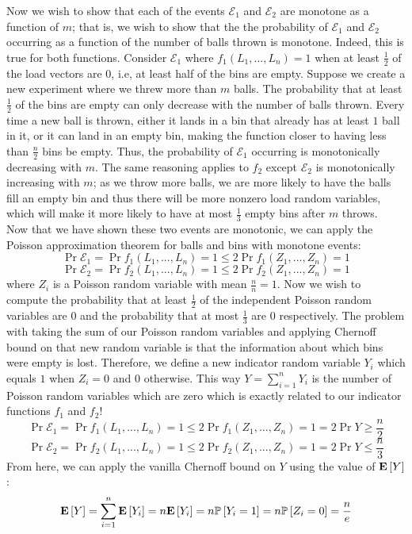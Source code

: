 \documentclass[12pt]{article}
\begin{document}
\begin{solution}
\begin{enumerate}[label=(\alph*)]
Now we wish to show that each of the events $\mathcal{E}_1$ and $\mathcal{E}_2$ are monotone as a function of $m$; that is, we wish to show that the the probability of $\mathcal{E}_1$ and $\mathcal{E}_2$ occurring as a function of the number of balls thrown is monotone. Indeed, this is true for both functions. Consider $\mathcal{E}_1$ where $f_{1}(L_1, ..., L_n)=1$ when at least $\frac{1}{2}$ of the load vectors are $0$, i.e, at least half of the bins are empty. Suppose we create a new experiment where we threw more than $m$ balls. The probability that at least $\frac{1}{2}$ of the bins are empty can only decrease with the number of balls thrown. Every time a new ball is thrown, either it lands in a bin that already has at least $1$ ball in it, or it can land in an empty bin, making the function closer to having less than $\frac{n}{2}$ bins be empty. Thus, the probability of $\mathcal{E}_1$ occurring is monotonically decreasing with $m$. The same reasoning applies to $f_2$ except $\mathcal{E}_2$ is monotonically increasing with $m$; as we throw more balls, we are more likely to have the balls fill an empty bin and thus there will be more nonzero load random variables, which will make it more likely to have at most $\frac{1}{3}$ empty bins after $m$ throws. \\
Now that we have shown these two events are monotonic, we can apply the Poisson approximation theorem for balls and bins with monotone events:
\[
\Pr{\mathcal{E}_1} = \Pr{f_{1}(L_1, ..., L_n)=1} \leq 2\Pr{f_{1}(Z_1, ..., Z_n)=1}
\]
\[
\Pr{\mathcal{E}_2} = \Pr{f_{2}(L_1, ..., L_n)=1} \leq 2\Pr{f_{2}(Z_1, ..., Z_n)=1}
\]
where $Z_i$ is a Poisson random variable with mean $\frac{n}{n} = 1$. Now we wish to compute the probability that at least $\frac{1}{2}$ of the independent Poisson random variables are $0$ and the probability that at most $\frac{1}{3}$ are $0$ respectively. The problem with taking the sum of our Poisson random variables and applying Chernoff bound on that new random variable is that the information about which bins were empty is lost. Therefore, we define a new indicator random variable $Y_i$ which equals $1$ when $Z_i =0$ and $0$ otherwise. This way $Y = \sum_{i=1}^{n}{Y_i}$ is the number of Poisson random variables which are zero which is exactly related to our indicator functions $f_1$ and $f_2$! 
\[
\Pr{\mathcal{E}_1} = \Pr{f_{1}(L_1, ..., L_n)=1} \leq 2\Pr{f_{1}(Z_1, ..., Z_n)=1} = 2\Pr{Y \geq \frac{n}{2}}
\]
\[
\Pr{\mathcal{E}_2} = \Pr{f_{2}(L_1, ..., L_n)=1} \leq 2\Pr{f_{2}(Z_1, ..., Z_n)=1} = 2\Pr{Y \leq \frac{n}{3}}
\]
From here, we can apply the vanilla Chernoff bound on $Y$ using the value of $\mathbf{E}\left[Y\right]$:
\[
\mathbf{E}\left[Y\right] = \sum_{i=1}^{n}{\mathbf{E}\left[Y_i\right]} = n\mathbf{E}\left[Y_i\right] = n\mathbb{P}\left[Y_i=1\right] = n\mathbb{P}\left[Z_i=0\right] = \frac{n}{e}
\]


\end{enumerate}
\end{solution}
\end{document}
